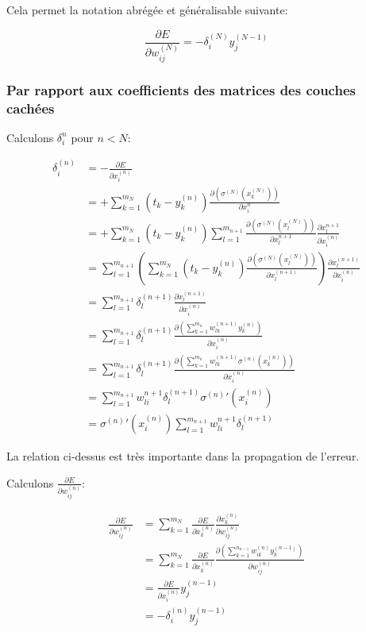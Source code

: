 \documentclass[11pt]{article}
\begin{document}
Cela permet la notation abrégée et généralisable suivante:

\begin{equation}
\frac{\partial E}{\partial w_{ij}^{(N)}}
= -\delta_{i}^{(N)}y_{j}^{(N-1)}
\end{equation}

\subsubsection{Par rapport aux coefficients des matrices des couches cachées}
\label{sec-2-3-2}

Calculons $\delta_{i}^{n}$ pour $n<N$:

\begin{align}
\delta_{i}^{(n)}
& = -\frac{\partial E}{\partial x_{i}^{(n)}}\\
& = +\sum_{k=1}^{m_{N}}(t_{k}-y_{k}^{(n)})
\frac{\partial (\sigma^{(N)}(x_{k}^{(N)}))}{\partial x_{i}^{n}}\\
& = +\sum_{k=1}^{m_{N}}(t_{k}-y_{k}^{(n)})
\sum_{l=1}^{m_{n+1}}
\frac{\partial \left(\sigma^{(N)}(x_{l}^{(N)})\right)}
{\partial x_{l}^{n+1}}
\frac{\partial x_{l}^{n+1}}{\partial x_{i}^{(n)}}\\
& = \sum_{l=1}^{m_{n+1}}\left(\sum_{k=1}^{m_{N}}(t_{k}-y_{k}^{(n)})
\frac{\partial \left(\sigma^{(N)}(x_{l}^{(N)})\right)}
{\partial x_{l}^{(n+1)}}\right)
\frac{\partial x_{l}^{(n+1)}}{\partial x_{i}^{(n)}}\\
& = \sum_{l=1}^{m_{n+1}}\delta_{l}^{(n+1)}
\frac{\partial x_{l}^{(n+1)}}{\partial x_{i}^{(n)}}\\
& = \sum_{l=1}^{m_{n+1}}\delta_{l}^{(n+1)}
\frac{\partial \left(\sum_{k=1}^{m_{n}}w_{lk}^{(n+1)}y_{k}^{(n)}
\right)}{\partial x_{i}^{(n)}}\\
& = \sum_{l=1}^{m_{n+1}}\delta_{l}^{(n+1)}
\frac{\partial \left(\sum_{k=1}^{m_{n}}w_{lk}^{(n+1)}
\sigma^{(n)}(x_{k}^{(n)})
\right)}{\partial x_{i}^{(n)}}\\
& = \sum_{l=1}^{m_{n+1}}w_{li}^{n+1}\delta_{l}^{(n+1)}\sigma^{(n)}'(x_{i}^{(n)})\\
& = \sigma^{(n)}'(x_{i}^{(n)})\sum_{l=1}^{m_{n+1}}w_{li}^{n+1}\delta_{l}^{(n+1)}
\end{align}

La relation ci-dessus est très importante dans la propagation de l'erreur.

Calculons $\frac{\partial E}{\partial w_{ij}^{(n)}}$:

\begin{align}
\frac{\partial E}{\partial w_{ij}^{(n)}}
& = \sum_{k=1}^{m_{N}}\frac{\partial E}{\partial x_{k}^{(n)}}
\frac{\partial x_{k}^{(n)}}{\partial w_{ij}^{(n)}}\\
& = \sum_{k=1}^{m_{N}}\frac{\partial E}{\partial x_{k}^{(n)}}
\frac{\partial (\sum_{k=1}^{n_{n-1}}w_{ik}^{(n)}y_{k}^{(n-1)})}
{\partial w_{ij}^{(n)}}\\
& = \frac{\partial E}{\partial x_{i}^{(n)}}y_{j}^{(n-1)}\\
& = -\delta_{i}^{(n)}y_{j}^{(n-1)}
\end{align}
\end{document}
